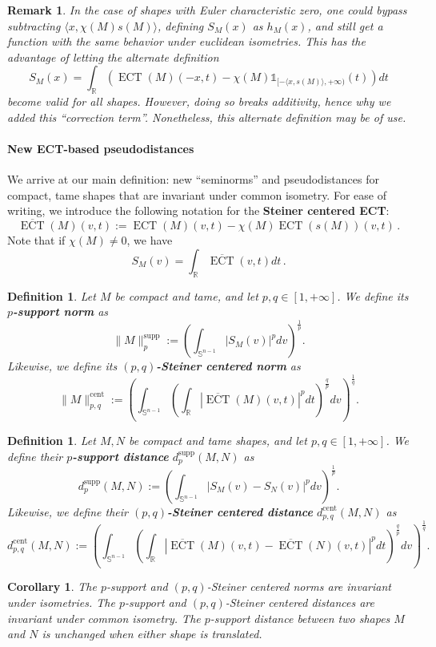\documentclass[a4paper]{article}
\newtheorem{coro}[theorem]{Corollary}
\newtheorem{definition}[theorem]{Definition}
\newtheorem{remark}[theorem]{Remark}
\newcommand{\ECT}{\operatorname{ECT}}
\newcommand{\bb}{\mathbb}
\newcommand{\la}{\langle}
\newcommand{\ra}{\rangle}
\newcommand{\dsupp}{d^{\operatorname{supp}}}
\newcommand{\dcent}{d^{\operatorname{cent}}}
\newcommand{\normsupp}[1]{\|#1\|^{\operatorname{supp}}}
\newcommand{\normcent}[1]{\|#1\|^{\operatorname{cent}}}
\begin{document}
\begin{remark}
	In the case of shapes with Euler characteristic zero, one could bypass subtracting $\la x, \chi(M)s(M) \ra$, defining $S_M(x)$ as $h_M(x)$, and still get a function with the same behavior under euclidean isometries. This has the advantage of letting the alternate definition
	\[ S_M(x) = \int_{\bb R}(\ECT(M)(-x,t)-\chi(M) \bb 1_{[-\la x, s(M) \ra,+\infty)}(t)) dt\] become valid for all shapes. However, doing so breaks additivity, hence why we added this ``correction term''. Nonetheless, this alternate definition may be of use.
\end{remark}


\paragraph{New ECT-based pseudodistances}
We arrive at our main definition: new ``seminorms'' and pseudodistances for compact, tame shapes that are invariant under common isometry. For ease of writing, we introduce the following notation for the \textbf{Steiner centered ECT}:
\[ \overline{\ECT}(M)(v,t):= \ECT(M)(v,t)-\chi(M) \ECT(s(M))(v,t) \, . \]
Note that if $\chi(M) \neq 0$, we have \[S_M(v)=\int_{\bb R} \overline{\ECT}(v,t) dt\, .\]

\begin{definition}
	\label{DefNormSupp}
	Let $M$ be compact and tame, and let $p,q\in [1, +\infty]$. We define its \textbf{$p$-support norm} as
	\[ \normsupp{M}_p:=\left(\int_{\bb S^{n-1}} |S_M(v)|^p dv\right)^{\frac{1}{p}}. \]
	Likewise, we define its \textbf{$(p,q)$-Steiner centered norm} as
	\[\normcent{M}_{p,q}:=\left(\int_{\bb S^{n-1}} \left( \int_{\bb R}|\overline{\ECT}(M)(v,t)|^p dt \right)^\frac{q}{p} dv\right)^\frac{1}{q} .\]
\end{definition}

\begin{definition}
	\label{DefDistSupp}
	Let $M,N$ be compact and tame shapes, and let $p,q\in [1, +\infty]$. We define their \textbf{$p$-support distance} $\dsupp_p(M,N)$ as
	\[ \dsupp_p(M,N):=\left(\int_{\bb S^{n-1}} |S_M(v)-S_N(v)|^p dv\right)^\frac{1}{p}.\]
	Likewise, we define their \textbf{$(p,q)$-Steiner centered distance} $\dcent_{p,q}(M,N)$ as
	\[ \dcent_{p,q}(M,N):=\left( \int_{\bb S^{n-1}} \left( \int_{\bb R} |\overline{\ECT}(M)(v,t)-\overline{\ECT}(N)(v,t)|^p dt\right)^{\frac{q}{p}} dv\right)^{\frac{1}{q}}. \]
\end{definition}

\begin{coro}
	The $p$-support and $(p,q)$-Steiner centered norms are invariant under isometries. The $p$-support and $(p,q)$-Steiner centered distances are invariant under common isometry. The $p$-support distance between two shapes $M$ and $N$ is unchanged when either shape is translated.
\end{coro}
\end{document}

